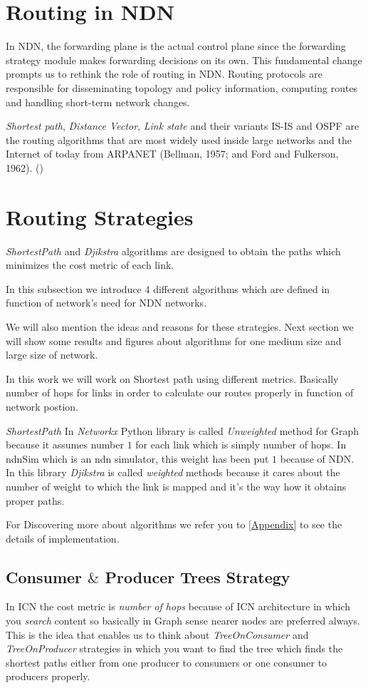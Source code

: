 \section{Routing in NDN}
In NDN, the forwarding plane is the actual control plane
since the forwarding strategy module makes forwarding decisions on its own.  This fundamental change prompts us
to rethink the role of routing in NDN. Routing protocols are responsible for disseminating topology and policy information, computing routes and handling short-term network changes.

\textit{Shortest path}, \textit{Distance Vector}, \textit{Link state} and their variants IS-IS and OSPF are the routing algorithms that are most widely used inside large networks and the Internet of today from ARPANET (Bellman, 1957; and Ford and Fulkerson, 1962). (\cite{modulation})


 
\section{Routing Strategies}
\textit{ShortestPath} and \textit{Djikstra} algorithms are designed to obtain the paths which minimizes the cost metric of each link. 

In this subsection we introduce 4 different algorithms which are defined in function of network's need for NDN networks.

We will also mention the ideas and reasons for these strategies. Next section we will show some results and figures about algorithms for one medium size and large size of network.

In this work we will work on Shortest path using different metrics. Basically number of hops for links in order to calculate our routes properly in function of network postion.

\textit{ShortestPath} In \textit{Networkx} Python library is called \textit{Unweighted} method for Graph because it assumes number $1$ for each link which is simply number of hops. In ndnSim which is an ndn simulator, this weight has been put $1$ because of NDN. In this library \textit{Djikstra} is called \textit{weighted} methods because it cares about the number of weight to which the link is mapped and it's the way how it obtains proper paths. 

For Discovering more about algorithms we refer you to \ref{Appendix} to see the details of implementation. 

\subsection{Consumer $\&$ Producer Trees Strategy}
In ICN the cost metric is \textit{number of hops} because of ICN architecture in which you \textit{search} content so basically in Graph sense nearer nodes are preferred always. This is the idea that enables us to think about \textit{TreeOnConsumer} and \textit{TreeOnProducer} strategies in which you want to find the tree which finds the shortest paths either from one producer to consumers or one consumer to producers properly.

